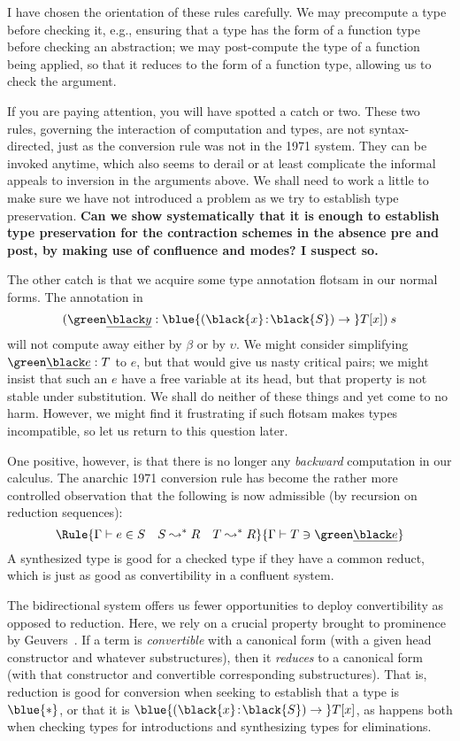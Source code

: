 \documentclass[natbib]{article}
\newcommand{\type}{\blue{\ast}}
\newcommand{\hb}{\!:\!}
\newcommand{\PI}[2]{\blue{(\black{#1}\hb \black{#2})\to\;}}
\begin{document}
I have chosen the orientation of these rules carefully. We may precompute a type before checking it, e.g., ensuring that a type has the form of a function type before checking an abstraction; we may post-compute the type of a function being applied, so that it reduces to the form of a function type, allowing us to check the argument.

If you are paying attention, you will have spotted a catch or two. These two rules, governing the interaction of computation and types, are not syntax-directed, just as the conversion rule was not in the 1971 system. They can be invoked anytime, which also seems to derail or at least complicate the informal appeals to inversion in the arguments above. We shall need to work a little to make sure we have not introduced a problem as we try to establish type preservation. \textbf{Can we show systematically that it is enough to establish type preservation for the contraction schemes in the absence pre and post, by making use of confluence and modes? I suspect so.}

The other catch is that we acquire some type annotation flotsam in our normal forms. The annotation in
\[
  (\el y : \PI xS T[x])\:s
\]
will not compute away either by $\beta$ or by $\upsilon$. We might consider simplifying $\el e : T$ to $e$,
but that would give us nasty critical pairs; we might insist that such an $e$ have a free variable at its head, but that property is not stable under substitution. We shall do neither of these things and yet come to no harm.
However, we might find it frustrating if such flotsam makes types incompatible, so let us return to this question later.

One positive, however, is that there is no longer any \emph{backward} computation in our calculus. The anarchic 1971 conversion rule has become the rather more controlled observation that the following is now admissible (by recursion on reduction sequences):
\[\Rule{\SYN\Gamma eS \quad S\leadsto^\ast R \quad T\leadsto^\ast R}
       {\CHK\Gamma T{\el e}}
\]
A synthesized type is good for a checked type if they have a common reduct, which is just as good as convertibility in a confluent system.

The bidirectional system offers us fewer opportunities to deploy convertibility as opposed to reduction. Here, we rely on a crucial property brought to prominence by Geuvers~\cite{geuvers:dunnoyet}. If a term is \emph{convertible} with a canonical form (with a given head constructor and whatever substructures), then it \emph{reduces} to a canonical form (with that constructor and convertible corresponding substructures). That is, reduction is good for conversion when seeking to establish that a type is $\type$, or that it is $\PI xS T[x]$,
as happens both when checking types for introductions and synthesizing types for eliminations.
\end{document}
